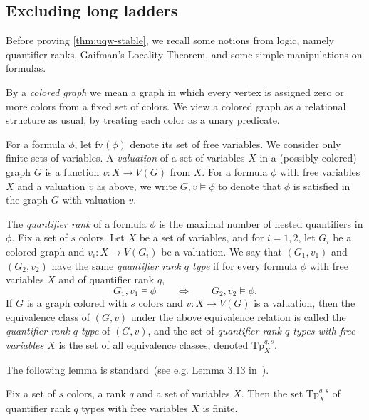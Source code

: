 \subsection{Excluding long ladders}
\label{sec:uqw-stable}

Before  proving \cref{thm:uqw-stable}, we recall some notions from logic, namely quantifier ranks, Gaifman's Locality Theorem, and some simple manipulations on formulas.


By a \emph{colored graph} we mean a graph  in which 
every vertex is assigned zero or more colors from a fixed set of colors. We view a colored graph as a relational structure as usual, by treating each color as a unary predicate. 

\newcommand{\rg}{\mathrm{rg}}
\newcommand{\fv}{\mathrm{fv}}
\newcommand{\from}{\colon}
For a formula $\phi$, let $\fv(\phi)$ denote its set 
of free variables. We consider only finite sets of variables. 
A \emph{valuation}
of a set of variables $X$ in a (possibly colored) graph $G$ is a function $v\colon X\to V(G)$ from $X$.
For a formula $\phi$ with free variables $X$ and a valuation $v$ as above, we write $G,v\models \phi$ to denote that $\phi$ is satisfied 
in the graph $G$ with valuation $v$.


The \emph{quantifier rank} of a formula $\phi$ is the maximal number of nested quantifiers in $\phi$. Fix a set of $s$ colors.
Let $X$ be a set of variables, and for $i=1,2$, let $G_i$
be a colored graph and $v_i:X\to V(G_i)$ be a valuation.
We say that $(G_1, v_1)$ and $(G_2,v_2)$
have the same \emph{quantifier rank $q$ type} %
if for every formula $\phi$ with  free variables $X$ and of quantifier rank $q$,
 $$G_1,v_1\models \phi\qquad\iff \qquad G_2,v_2\models \phi.$$
If $G$ is a graph colored with $s$ colors and 
 $v:X\to V(G)$ is a valuation, 
then the equivalence class of $(G, v)$ under the above equivalence relation is called the \emph{quantifier rank $q$ type} of $(G,v)$, and  the set of \emph{quantifier rank $q$ types with  free variables $X$}
is the set of all equivalence classes, denoted
$\mathrm{Tp}^{q,s}_X$.

The following lemma is standard~(see e.g. Lemma 3.13 in~\cite{libkin}).
\begin{lemma}\label{lem:q-types}
	Fix a set of $s$ colors, a rank $q$ and a set of variables $X$.
	Then the set $\mathrm{Tp}^{q,s}_X$ of quantifier rank $q$ types with free variables $X$ is finite.
\end{lemma}


